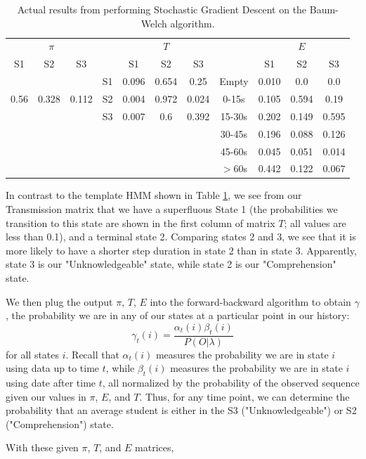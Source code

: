 \documentclass{article} %
\begin{document}
\begin{table}[t]
\begin{center}
\begin{tabular}{ccc|c|ccc|c|ccc}
\multicolumn{3}{c}{$\pi$} && \multicolumn{3}{c}{$T$} && \multicolumn{3}{c}{$E$}\\
S1 & S2 & S3 & & S1 & S2 & S3 && S1 & S2 & S3\\
& & & S1 & 0.096 & 0.654 & 0.25  &Empty & 0.010 & 0.0 & 0.0\\
0.56 & 0.328 & 0.112 & S2 & 0.004 & 0.972 & 0.024 &0-15s& 0.105 & 0.594 & 0.19\\
&&& S3 & 0.007 & 0.6 & 0.392 &15-30s& 0.202 & 0.149 & 0.595\\
&&&&&&&30-45s & 0.196 & 0.088 & 0.126\\
&&&&&&&45-60s & 0.045 & 0.051 & 0.014\\
&&&&&&&$>$60s& 0.442 & 0.122 & 0.067\\
\end{tabular}
\caption{Actual results from performing Stochastic Gradient Descent on the Baum-Welch algorithm.}\label{HMMprop}
\end{center}
\end{table}

In contrast to the template HMM shown in Table \ref{HMMprop}, we see from our Transmission matrix that we have a superfluous State 1 (the probabilities we transition to this state are shown in the first column of matrix $T$; all values are less than 0.1), and a terminal state 2. Comparing states 2 and 3, we see that it is more likely to have a shorter step duration in state 2 than in state 3. Apparently, state 3 is our "Unknowledgeable" state, while state 2 is our "Comprehension" state.

We then plug the output $\pi$, $T$, $E$ into the forward-backward algorithm to obtain $\gamma$, the probability we are in any of our states at a particular point in our history:
$$
\gamma_t(i) = \frac{\alpha_t(i)\beta_t(i)}{P(O|\lambda)}
$$
for all states $i$. Recall that $\alpha_t(i)$ measures the probability we are in state $i$ using data up to time $t$, while $\beta_t(i)$ measures the probability we are in state $i$ using date after time $t$, all normalized by the probability of the observed sequence given our values in $\pi$, $E$, and $T$. Thus, for any time point, we can determine the probability that an average student is either in the S3 ("Unknowledgeable") or S2 ("Comprehension") state.

With these given $\pi$, $T$, and $E$ matrices, 
\end{document}
